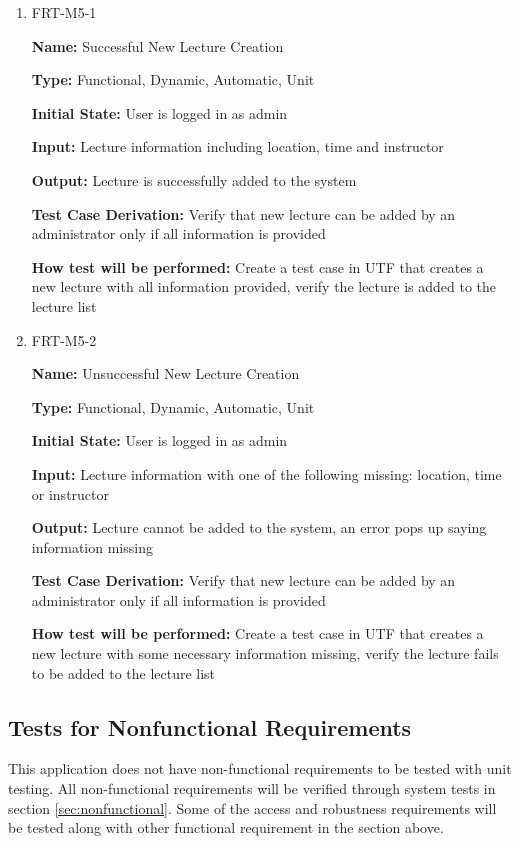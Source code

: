 \documentclass[12pt, titlepage]{article}
\begin{document}
\begin{enumerate}
\item{FRT-M5-1}

\textbf{Name:} Successful New Lecture Creation

\textbf{Type:} Functional, Dynamic, Automatic, Unit
					
\textbf{Initial State:} User is logged in as admin
					
\textbf{Input:} Lecture information including location, time and instructor
					
\textbf{Output:} Lecture is successfully added to the system

\textbf{Test Case Derivation:} Verify that new lecture can be added by an administrator only if all information is provided

\textbf{How test will be performed:} Create a test case in UTF that creates a new lecture with all information provided, verify the lecture is added to the lecture list

\item{FRT-M5-2}

\textbf{Name:} Unsuccessful New Lecture Creation

\textbf{Type:} Functional, Dynamic, Automatic, Unit
					
\textbf{Initial State:} User is logged in as admin
					
\textbf{Input:} Lecture information with one of the following missing: location, time or instructor
					
\textbf{Output:} Lecture cannot be added to the system, an error pops up saying information missing

\textbf{Test Case Derivation:} Verify that new lecture can be added by an administrator only if all information is provided

\textbf{How test will be performed:} Create a test case in UTF that creates a new lecture with some necessary information missing, verify the lecture fails to be added to the lecture list
\end{enumerate}

\subsection{Tests for Nonfunctional Requirements}

This application does not have non-functional requirements to be tested with unit testing. All non-functional requirements will be verified through system tests in section \ref{sec:nonfunctional}. Some of the access and robustness requirements will be tested along with other functional requirement in the section above.
\end{document}
